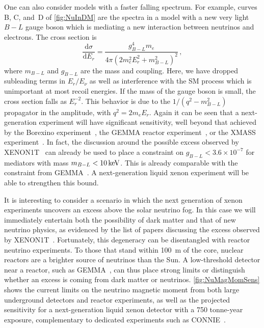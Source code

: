 One can also consider models with a faster falling spectrum. For example, curves B, C, and~D of \autoref{fig:NuInDM} are the spectra in a model with a new very light $B-L$ gauge boson which is mediating a new interaction between neutrinos and electrons. The cross section is
\begin{equation}
\frac{\mathrm{d}\sigma}{\mathrm{d}E_r}
=\frac{g_{B-L}^4 m_e}{4\pi (2m_e^2E_r^2 + m_{B-L}^2)^2}\,,
\end{equation}
where $m_{B-L}$ and $g_{B-L}$ are the mass and coupling. Here, we have dropped subleading terms in $E_r/E_\nu$ as well as interference with the SM process which is unimportant at most recoil energies. If the mass of the gauge boson is small, the cross section falls as $E_r^{-2}$. This behavior is due to the $1/(q^2-m_{B-L}^2)$ propagator in the amplitude, with $q^2=2m_e E_r$. Again it can be seen that a next-generation experiment will have significant sensitivity, well beyond that achieved by the Borexino experiment~\cite{Bellini:2011rx}, the GEMMA reactor experiment~\cite{Beda:2009kx}, or the XMASS experiment~\cite{Abe:2020nwr}. In fact, the discussion around the possible excess observed by XENON1T~\cite{Aprile:2020tmw} can already be used to place a constraint on $g_{B-L}<3.6\times 10^{-7}$ for mediators with mass $m_{B-L}<10\, \mathrm{keV}$. This is already comparable with the constraint from GEMMA~\cite{Boehm:2020ltd}.  A next-generation liquid xenon experiment will be able to strengthen this bound.

It is interesting to consider a scenario in which the next generation of xenon experiments uncovers an excess above the solar neutrino fog. In this case we will immediately entertain both the possibility of dark matter and that of new neutrino physics, as evidenced by the list of papers discussing the excess observed by XENON1T~\cite{Aprile:2020tmw:refs}. Fortunately, this degeneracy can be disentangled with reactor neutrino experiments. To those that stand within 100~m of the core, nuclear reactors are a brighter source of neutrinos than the Sun. A low-threshold detector near a reactor, such as GEMMA~\cite{Beda:2009kx}, can thus place strong limits or distinguish whether an excess is coming from dark matter or neutrinos. \autoref{fig:NuMagMomSens} shows the current limits on the neutrino magnetic moment from both large underground detectors and reactor experiments, as well as the projected sensitivity for a next-generation liquid xenon detector with a 750 tonne-year exposure, complementary to dedicated experiments such as CONNIE~\cite{Aguilar-Arevalo:2016khx}. 

